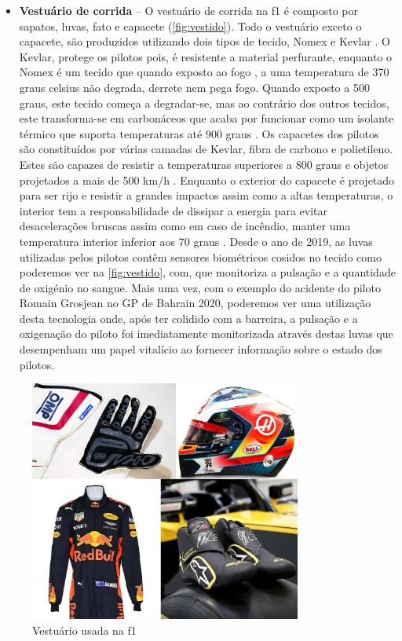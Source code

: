 \documentclass{report}
\begin{document}
\begin{itemize}
\item \textbf{Vestuário de corrida} – O vestuário de corrida na \ac{f1} é composto por sapatos, luvas, fato e capacete (\autoref{fig:vestido}). Todo o vestuário exceto o capacete, são produzidos utilizando dois tipos de tecido, Nomex e Kevlar \cite{capacete}. O Kevlar, protege os pilotos pois, é resistente a material perfurante, enquanto o Nomex é um tecido que quando exposto ao fogo \cite{fogo}, a uma temperatura de 370 graus celsius não degrada, derrete nem pega fogo. Quando exposto a 500 graus, este tecido começa a degradar-se, mas ao contrário dos outros tecidos, este transforma-se em carbonáceos que acaba por funcionar como um isolante térmico que suporta temperaturas até 900 graus \cite{roupa}.
Os capacetes dos pilotos são constituídos por várias camadas de Kevlar, fibra de carbono e polietileno. Estes são capazes de resistir a temperaturas superiores a 800 graus e objetos projetados a mais de 500 km/h \cite{velocidade}. Enquanto o exterior do capacete é projetado para ser rijo e resistir a grandes impactos assim como a altas temperaturas, o interior tem a responsabilidade de dissipar a energia para evitar desacelerações bruscas assim como em caso de incêndio, manter uma temperatura interior inferior aos 70 graus \cite{velocidade}.
Desde o ano de 2019, as luvas \cite{luvas} utilizadas pelos pilotos contêm sensores biométricos cosidos no tecido como poderemos ver na \autoref{fig:vestido}, com, que monitoriza a pulsação e a quantidade de oxigénio no sangue.
Mais uma vez, com o exemplo do acidente do piloto Romain Grosjean no GP de Bahrain 2020, poderemos ver uma utilização desta tecnologia onde, após ter colidido com a barreira, a pulsação e a oxigenação do piloto foi imediatamente monitorizada através destas luvas que desempenham um papel vitalício ao fornecer informação sobre o estado dos pilotos.\\[1.5cm]


\end{itemize}

\begin{figure}[h]
\center %
\includegraphics[height=225pt]{vestido}
\caption{Vestuário usada na \ac{f1}}
\label{fig:vestido}
\end{figure}
\end{document}
